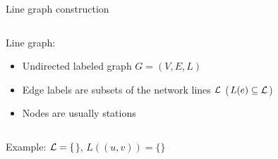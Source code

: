 \documentclass{beamer}
\begin{document}
\begin{frame}{Line graph construction}
	\begin{columns}[T]
		\begin{column}[T]{0.5\textwidth}
			Line graph:
			\begin{itemize}[<+->]
				\item Undirected labeled graph $G = (V, E, L)$
				\item Edge labels are subsets of the network lines $\cal L$ ($L(e) \subseteq \cal L$)
				\item Nodes are \alert{usually} stations
			\end{itemize}
		\end{column}
		\begin{column}{0.5\textwidth}
			\centering
		\end{column}
	\end{columns}

	\pause[\thebeamerpauses]
	Example: $\cal L = \{$$\}$, $L\left(\left(u, v\right)\right) = \{$$\}$
\end{frame}
\end{document}
